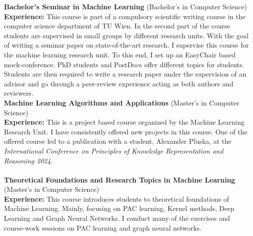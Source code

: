 \documentclass[10pt, a4paper]{article}
\newcommand{\years}[1]{\marginnote{\scriptsize #1}}
\begin{document}
\years{2023 - Now} \textbf{Bachelor's Seminar in Machine Learning} (Bachelor's in Computer Science)\\
\textbf{Experience:} This course is part of a compulsory scientific writing course in the computer science department of TU Wien. In the second part of the course students are supervised in small groups by different research units. With the goal of writing a seminar paper on state-of-the-art research. I supervise this course for the machine learning research unit. To this end, I set up an EasyChair based mock-conference. PhD students and PostDocs offer different topics for students. Students are then required to write a research paper under the supervision of an advisor and go through a peer-review experience acting as both authors and reviewers.   \\

\years{2023 - Now} \textbf{Machine Learning Algorithms and Applications}
 (Master's in Computer Science)\\
 \textbf{Experience:} This is a project based course organized by the Machine Learning Research Unit. I have consistently offered new projects in this course. One of the offered course led to a publication with a student, Alexander Pluska, at the \emph{International Conference on Principles of Knowledge Representation and Reasoning 2024}. \\ \\ 
 
 \years{2023 - Now} \textbf{Theoretical Foundations and Research Topics in Machine Learning}\\
 (Master's in Computer Science)\\
 \textbf{Experience:} This course introduces students to theoretical foundations of Machine Learning. Mainly, focusing on PAC learning, Kernel methods, Deep Learning and Graph Neural Networks.
 I conduct many of the exercises and course-work sessions on PAC learning and graph neural networks.
\end{document}
